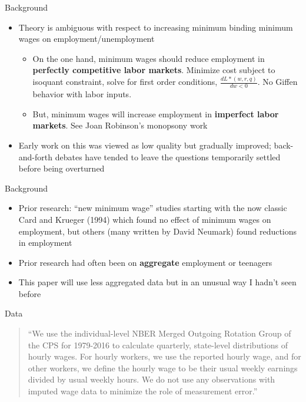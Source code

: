 \documentclass{beamer}
\begin{document}
\begin{frame}{Background}

\begin{itemize}
\item Theory is ambiguous with respect to increasing minimum binding minimum wages on employment/unemployment 
	\begin{itemize}
	\item On the one hand, minimum wages should reduce employment in \textbf{perfectly competitive labor markets}. Minimize cost subject to isoquant constraint, solve for first order conditions, $\frac{d L*(w,r,q)}{d w<0}$. No Giffen behavior with labor inputs.
	\item But, minimum wages will increase employment in \textbf{imperfect labor markets}. See Joan Robinson's monopsony work 
	\end{itemize}
\item Early work on this was viewed as low quality but gradually improved; back-and-forth debates have tended to leave the questions temporarily settled before being overturned
\end{itemize}
\end{frame}

\begin{frame}{Background}

\begin{itemize}
\item Prior research: ``new minimum wage'' studies starting with the now classic Card and Krueger (1994) which found no effect of minimum wages on employment, but others (many written by David Neumark) found reductions in employment
\item Prior research had often been on \textbf{aggregate} employment or teenagers
\item This paper will use less aggregated data but in an unusual way I hadn't seen before
\end{itemize}

\end{frame}

\begin{frame}{Data}

\begin{quote}
``We use the individual-level NBER Merged Outgoing Rotation Group of the CPS for 1979-2016 to calculate quarterly, state-level distributions of hourly wages. For hourly workers, we use the reported hourly wage, and for other workers, we define the hourly wage to be their usual weekly earnings divided by usual weekly hours.  We do not use any observations with imputed wage data to minimize the role of measurement error.''
\end{quote}


\end{frame}
\end{document}
